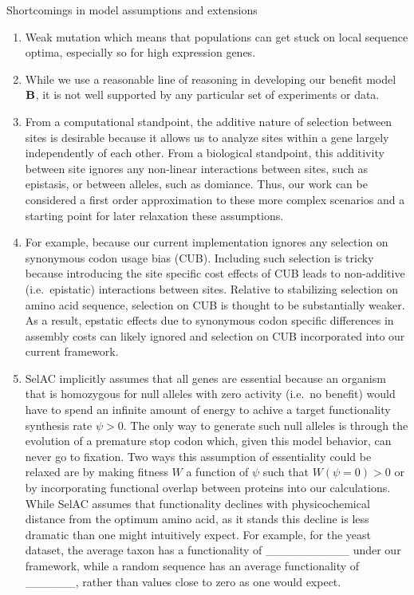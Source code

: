\documentclass{article}
\newcommand{\Func}{\ensuremath{\text{\textbf{B}}}\xspace}
\newcommand{\selac}{SelAC\xspace}
\begin{document}
Shortcomings in model assumptions and extensions
\begin{enumerate}
\item Weak mutation which means that populations can get stuck on local sequence optima, especially so for high expression genes.
\item While we use a reasonable line of reasoning in developing our benefit model \Func, it is not well supported by any particular set of experiments or data.
\item From a computational standpoint, the additive nature of selection between sites is desirable because it allows us to analyze sites within a gene largely independently of each other.
  From a biological standpoint, this additivity between site ignores any non-linear interactions between sites, such as epistasis, or between alleles, such as domiance.  Thus, our work can be considered a first order approximation to these more complex scenarios and a starting point for later relaxation these assumptions.
\item For example, because our current implementation ignores any selection on synonymous codon usage bias (CUB).
  Including such selection is tricky because introducing the site specific cost effects of CUB leads to non-additive (i.e.~epistatic) interactions between sites.  Relative to stabilizing selection on amino acid sequence, selection on CUB is thought to be substantially weaker.
  As a result, epstatic effects due to synonymous codon specific differences in assembly costs can likely ignored and selection on CUB incorporated into our current framework.
\item \selac implicitly assumes that all genes are essential because an organism that is homozygous for null alleles with zero activity (i.e.~no benefit) would have to spend an infinite amount of energy to achive a target functionality synthesis rate $\psi > 0$.
  The only way to generate such null alleles is through the evolution of a premature stop codon which, given this model behavior, can never go to fixation.
  Two ways this assumption of essentiality could be relaxed are by making fitness $W$ a function of $\psi$ such that  $W(\psi = 0) > 0$ or by incorporating functional overlap between proteins into our calculations.
While \selac assumes that functionality declines with physicochemical distance from the optimum amino acid, as it stands this decline is less dramatic than one might intuitively expect.
For example, for the yeast dataset, the average taxon has a functionality of \_\_\_\_\_\_\_\_\_\_ under our framework, while a random sequence has an average functionality of \_\_\_\_\_\_, rather than values close to zero as one would expect.

\end{enumerate}
\end{document}
